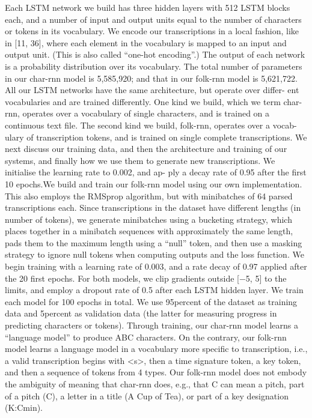 Each LSTM network we build has three hidden layers with 512 LSTM blocks each, and a number of input and output units equal to the number of characters or tokens in its vocabulary. We encode our transcriptions in a local fashion, like in [11, 36], where each element in the vocabulary is mapped to an input and output unit. (This is also called “one-hot encoding”.) The output of each network is a probability distribution over its vocabulary. The total number of parameters in our char-rnn model is 5,585,920; and that in our folk-rnn model is 5,621,722.
All our LSTM networks have the same architecture, but operate over differ- ent vocabularies and are trained differently. One kind we build, which we term char-rnn, operates over a vocabulary of single characters, and is trained on a continuous text file. The second kind we build, folk-rnn, operates over a vocab- ulary of transcription tokens, and is trained on single complete transcriptions. We next discuss our training data, and then the architecture and training of our systems, and finally how we use them to generate new transcriptions.
We initialise the learning rate to 0.002, and ap- ply a decay rate of 0.95 after the first 10 epochs.We build and train our folk-rnn model using our own implementation. This also employs the RMSprop algorithm, but with minibatches of 64 parsed transcriptions each. Since transcriptions in the dataset have different lengths (in number of tokens), we generate minibatches using a bucketing strategy, which places together in a minibatch sequences with approximately the same length, pads them to the maximum length using a “null” token, and then use a masking strategy to ignore null tokens when computing outputs and the loss function. We begin training with a learning rate of 0.003, and a rate decay of 0.97 applied after the 20 first epochs.
For both models, we clip gradients outside [−5, 5] to the limits, and employ
a dropout rate of 0.5 after each LSTM hidden layer. We train each model for 100 epochs in total. We use 95percent of the dataset as training data and 5percent as validation data (the latter for measuring progress in predicting characters or tokens). Through training, our char-rnn model learns a “language model” to produce ABC characters. On the contrary, our folk-rnn model learns a language model in a vocabulary more specific to transcription, i.e., a valid transcription begins with <s>, then a time signature token, a key token, and then a sequence of tokens from 4 types. Our folk-rnn model does not embody the ambiguity of meaning that char-rnn does, e.g., that C can mean a pitch, part of a pitch (C), a letter in a title (A Cup of Tea), or part of a key designation (K:Cmin).
